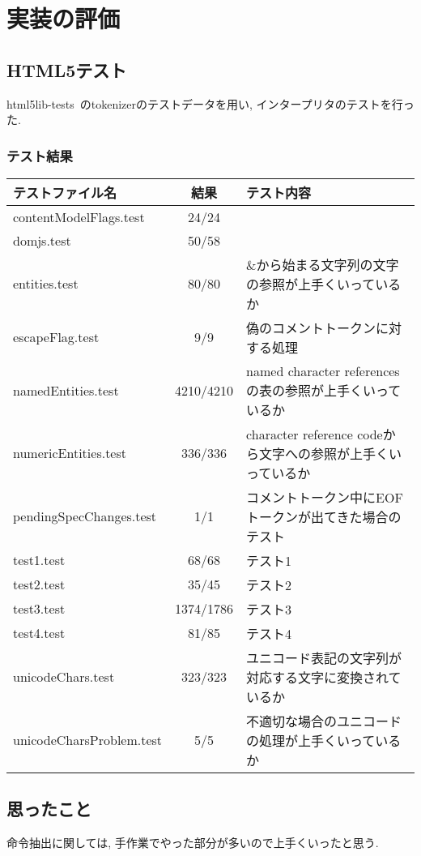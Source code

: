\documentclass[uplatex,a4j]{jsreport}
\begin{document}
\chapter{実装の評価}
\label{評価}
\section{HTML5テスト}%
html5lib-tests~\cite{html5lib-tests}のtokenizerのテストデータを用い, インタープリタのテストを行った.
\subsection*{テスト結果}
\begin{table}[htb]
    \begin{tabular}{|l|c|l|} \hline
      テストファイル名 & 結果 & テスト内容\\ \hline 
      contentModelFlags.test & 24/24 &  \\
      domjs.test & 50/58 &  \\
      entities.test & 80/80 & \&から始まる文字列の文字の参照が上手くいっているか\\
      escapeFlag.test & 9/9 & 偽のコメントトークンに対する処理\\
      namedEntities.test & 4210/4210 & named character referencesの表の参照が上手くいっているか\\
      numericEntities.test & 336/336 & character reference codeから文字への参照が上手くいっているか\\
      pendingSpecChanges.test & 1/1 & コメントトークン中にEOFトークンが出てきた場合のテスト\\
      test1.test & 68/68 & テスト1\\
      test2.test & 35/45 & テスト2 \\
      test3.test & 1374/1786 & テスト3 \\
      test4.test & 81/85 & テスト4 \\
      unicodeChars.test & 323/323 & ユニコード表記の文字列が対応する文字に変換されているか\\
      unicodeCharsProblem.test & 5/5 & 不適切な場合のユニコードの処理が上手くいっているか\\ \hline 
    \end{tabular}
\end{table}

\section{思ったこと}
命令抽出に関しては, 手作業でやった部分が多いので上手くいったと思う.
\end{document}
